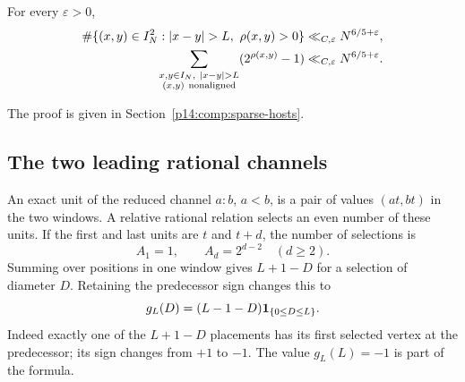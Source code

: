 \begin{proposition}\label{p1:arith:hosts}
For every $\varepsilon>0$,
\begin{align}
 \#\{(x,y)\in I_N^2:|x-y|>L,\ \rho(x,y)>0\}
   &\ll_{C,\varepsilon}N^{6/5+\varepsilon},
       \label{p1:arith:hostbound}\\
 \sum_{\substack{x,y\in I_N,\ |x-y|>L\\(x,y)\ {\rm nonaligned}}}
       (2^{\rho(x,y)}-1)
   &\ll_{C,\varepsilon}N^{6/5+\varepsilon}.
       \label{p1:arith:nonaligned}
\end{align}
\end{proposition}

The proof is given in Section~\ref{p14:comp:sparse-hosts}.

\subsection{The two leading rational channels}

An exact unit of the reduced channel $a:b$, $a<b$, is a pair of values
$(at,bt)$ in the two windows.  A relative rational relation selects an even
number of these units.  If the first and last units are $t$ and $t+d$, the
number of selections is
\[
 A_1=1,\qquad A_d=2^{d-2}\quad(d\geq2).
\]
Summing over positions in one window gives $L+1-D$ for a selection of
diameter $D$.  Retaining the predecessor sign changes this to
\begin{equation}\label{p1:arith:diametersign}
 g_L(D)=(L-1-D)\mathbf 1_{\{0\leq D\leq L\}}.
\end{equation}
Indeed exactly one of the $L+1-D$ placements has its first selected vertex
at the predecessor; its sign changes from $+1$ to $-1$.  The value
$g_L(L)=-1$ is part of the formula.

